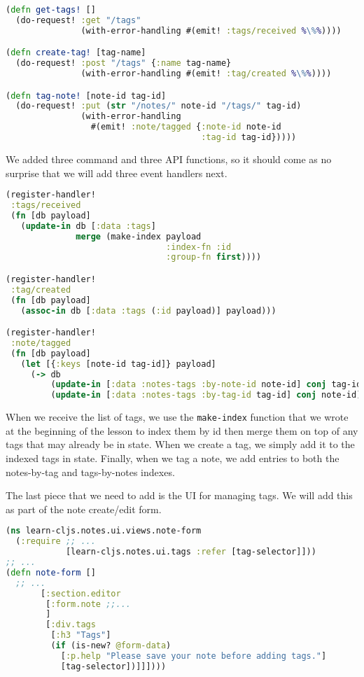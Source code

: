 \documentclass[10pt,twoside,openright]{memoir}
\begin{document}
\begin{lstlisting}[language=Clojure, caption={notes/api.cljs}]
(defn get-tags! []
  (do-request! :get "/tags"
               (with-error-handling #(emit! :tags/received %\%%))))

(defn create-tag! [tag-name]
  (do-request! :post "/tags" {:name tag-name}
               (with-error-handling #(emit! :tag/created %\%%))))

(defn tag-note! [note-id tag-id]
  (do-request! :put (str "/notes/" note-id "/tags/" tag-id)
               (with-error-handling
                 #(emit! :note/tagged {:note-id note-id
                                       :tag-id tag-id}))))
\end{lstlisting}

We added three command and three API functions, so it should come as no
surprise that we will add three event handlers next.

\begin{lstlisting}[language=Clojure, caption={notes/event\_handlers/api\_data.cljs}]
(register-handler!
 :tags/received
 (fn [db payload]
   (update-in db [:data :tags]
              merge (make-index payload
                                :index-fn :id
                                :group-fn first))))

(register-handler!
 :tag/created
 (fn [db payload]
   (assoc-in db [:data :tags (:id payload)] payload)))

(register-handler!
 :note/tagged
 (fn [db payload]
   (let [{:keys [note-id tag-id]} payload]
     (-> db
         (update-in [:data :notes-tags :by-note-id note-id] conj tag-id)
         (update-in [:data :notes-tags :by-tag-id tag-id] conj note-id)))))
\end{lstlisting}

When we receive the list of tags, we use the \texttt{make-index}
function that we wrote at the beginning of the lesson to index them by
id then merge them on top of any tags that may already be in state. When
we create a tag, we simply add it to the indexed tags in state. Finally,
when we tag a note, we add entries to both the notes-by-tag and
tags-by-notes indexes.

The last piece that we need to add is the UI for managing tags. We will
add this as part of the note create/edit form.

\begin{lstlisting}[language=Clojure, caption={notes/ui/views/note\_form.cljs}]
(ns learn-cljs.notes.ui.views.note-form
  (:require ;; ...
            [learn-cljs.notes.ui.tags :refer [tag-selector]]))
;; ...
(defn note-form []
  ;; ...
       [:section.editor
        [:form.note ;;...
        ]
        [:div.tags
         [:h3 "Tags"]
         (if (is-new? @form-data)
           [:p.help "Please save your note before adding tags."]
           [tag-selector])]]])))
\end{lstlisting}
\end{document}
